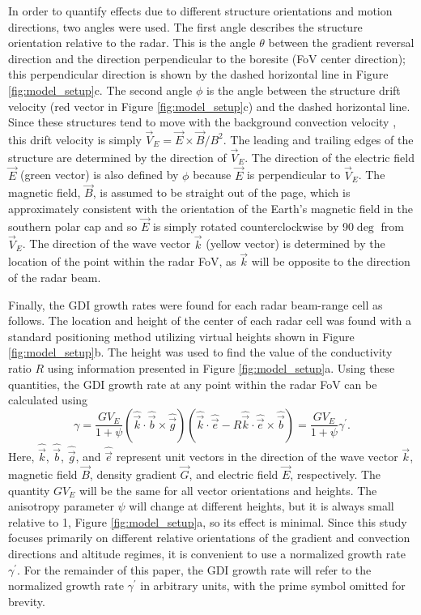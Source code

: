 In order to quantify effects due to different structure orientations and motion directions, two angles were used. The first angle describes the structure orientation relative to the radar. This is the angle \(\theta\) between the gradient reversal direction and the direction perpendicular to the boresite (FoV center direction); this perpendicular direction is shown by the dashed horizontal line in Figure \ref{fig:model_setup}c. The second angle \(\phi\) is the angle between the structure drift velocity (red vector in Figure \ref{fig:model_setup}c) and the dashed horizontal line. Since these structures tend to move with the background convection velocity \citep{Makarevich2015b}, this drift velocity is simply \(\vec{V}_E= \vec{E}\times\vec{B}/B^2\). The leading and trailing edges of the structure are determined by the direction of \(\vec{V}_E\).  The direction of the electric field \(\vec{E}\) (green vector) is also defined by \(\phi\) because \(\vec{E}\) is perpendicular to \(\vec{V}_E\). The magnetic field, \(\vec{B}\), is assumed to be straight out of the page, which is approximately consistent with the orientation of the Earth's magnetic field in the southern polar cap and so \(\vec{E}\) is simply rotated counterclockwise by 90\(\deg\) from \(\vec{V}_E\). The direction of the wave vector \(\vec{k}\) (yellow vector) is determined by the location of the point within the radar FoV, as \(\vec{k}\) will be opposite to the direction of the radar beam.

Finally, the GDI growth rates were found for each radar beam-range cell as follows. The location and height of the center of each radar cell was found with a standard positioning method utilizing virtual heights shown in Figure \ref{fig:model_setup}b. The height was used to find the value of the conductivity ratio \(R\) using information presented in Figure \ref{fig:model_setup}a.  Using these quantities, the GDI growth rate at any point within the radar FoV can be calculated \citep[eqn. 18]{Makarevich2014c} using
\begin{equation}
\label{eqn:Mak14gr}
\gamma = \frac{GV_E}{1+\psi}\left(\hat{\vec{k}}\cdot\hat{\vec{b}}\times\hat{\vec{g}}\right)\left(\hat{\vec{k}}\cdot\hat{\vec{e}}-R\hat{\vec{k}}\cdot\hat{\vec{e}}\times\hat{\vec{b}}\right) = \frac{GV_E}{1+\psi}\gamma^\prime.
\end{equation}
Here, \(\hat{\vec{k}}\), \(\hat{\vec{b}}\), \(\hat{\vec{g}}\), and \(\hat{\vec{e}}\) represent unit vectors in the direction of the wave vector \(\vec{k}\), magnetic field \(\vec{B}\), density gradient \(\vec{G}\), and electric field \(\vec{E}\), respectively.  The quantity \(GV_E\) will be the same for all vector orientations and heights. The anisotropy parameter \(\psi\) will change at different heights, but it is always small relative to 1, Figure \ref{fig:model_setup}a, so its effect is minimal.  Since this study focuses primarily on different relative orientations of the gradient and convection directions and altitude regimes, it is convenient to use a normalized growth rate \(\gamma^\prime\).  For the remainder of this paper, the GDI growth rate will refer to the normalized growth rate \(\gamma^\prime\) in arbitrary units, with the prime symbol omitted for brevity.




